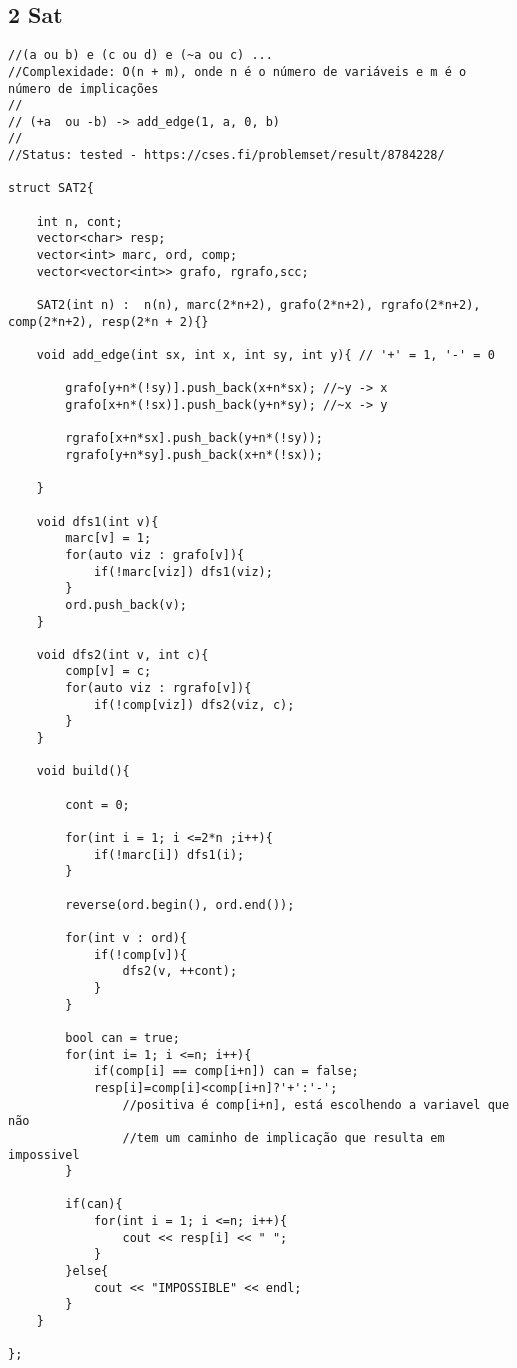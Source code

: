 \documentclass[11pt, a4paper, twoside]{article}
\begin{document}
\subsection{2 Sat}
\begin{verbatim}
//(a ou b) e (c ou d) e (~a ou c) ...
//Complexidade: O(n + m), onde n é o número de variáveis e m é o número de implicações
//
// (+a  ou -b) -> add_edge(1, a, 0, b)
//
//Status: tested - https://cses.fi/problemset/result/8784228/

struct SAT2{
    
    int n, cont;
    vector<char> resp;
    vector<int> marc, ord, comp;
    vector<vector<int>> grafo, rgrafo,scc;
    
    SAT2(int n) :  n(n), marc(2*n+2), grafo(2*n+2), rgrafo(2*n+2), comp(2*n+2), resp(2*n + 2){}
    
    void add_edge(int sx, int x, int sy, int y){ // '+' = 1, '-' = 0
            
        grafo[y+n*(!sy)].push_back(x+n*sx); //~y -> x
        grafo[x+n*(!sx)].push_back(y+n*sy); //~x -> y
    
        rgrafo[x+n*sx].push_back(y+n*(!sy)); 
        rgrafo[y+n*sy].push_back(x+n*(!sx));
            
    }
    
    void dfs1(int v){   
        marc[v] = 1;
        for(auto viz : grafo[v]){
            if(!marc[viz]) dfs1(viz);
        }
        ord.push_back(v);
    }
    
    void dfs2(int v, int c){
        comp[v] = c;
        for(auto viz : rgrafo[v]){
            if(!comp[viz]) dfs2(viz, c);
        } 
    }
    
    void build(){
    
        cont = 0;
    
        for(int i = 1; i <=2*n ;i++){
            if(!marc[i]) dfs1(i);
        }
    
        reverse(ord.begin(), ord.end());
    
        for(int v : ord){
            if(!comp[v]){
                dfs2(v, ++cont);
            }
        }
    
        bool can = true;
        for(int i= 1; i <=n; i++){
            if(comp[i] == comp[i+n]) can = false;
            resp[i]=comp[i]<comp[i+n]?'+':'-'; 
                //positiva é comp[i+n], está escolhendo a variavel que não
                //tem um caminho de implicação que resulta em impossivel
        }
    
        if(can){
            for(int i = 1; i <=n; i++){
                cout << resp[i] << " ";
            }
        }else{
            cout << "IMPOSSIBLE" << endl;
        }
    }
    
};
\end{verbatim}
\end{document}
